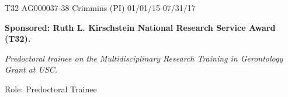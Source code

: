 \documentclass[letterpaper,10pt]{article}
\begin{document}
\begin{itemize}
	
	

	\begin{center}
	\parbox{6.5in}{{T32 AG000037-38  \hspace{1cm} Crimmins (PI)}   \hspace{6.1cm} 01/01/15-07/31/17}
	\parbox{6.5in}{\textbf{Sponsored: Ruth L. Kirschstein National Research Service Award (T32).}}
	\parbox{6.5in}{\textit{Predoctoral trainee on the Multidisciplinary Research Training in Gerontology Grant at USC. }}
	\parbox{6.5in}{Role: Predoctoral Trainee}
\end{center}

	
\end{itemize}
\end{document}
